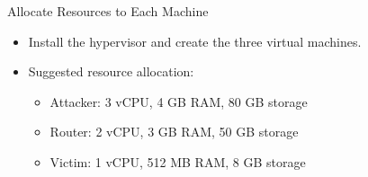 \begin{frame}{Allocate Resources to Each Machine}
  \begin{itemize}
    \item Install the hypervisor and create the three virtual machines.
    \item Suggested resource allocation:
      \begin{itemize}
        \item Attacker: 3 vCPU, 4 GB RAM, 80 GB storage
        \item Router: 2 vCPU, 3 GB RAM, 50 GB storage
        \item Victim: 1 vCPU, 512 MB RAM, 8 GB storage
      \end{itemize}
  \end{itemize}
\end{frame}
